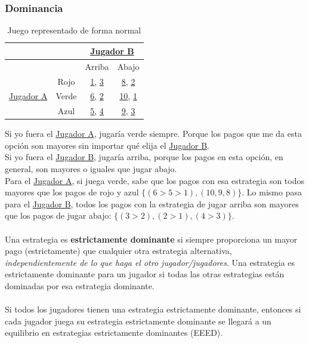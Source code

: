 \documentclass{article}
\newcommand{\ulcolor}[2][Red]{\setulcolor{#1}\ul{#2}}
\begin{document}
            \subsubsection*{Dominancia}
                \begin{table}[h]
                    \centering
                        \begin{tabular}{|c|c|c|c|}
                        \hline
                                                &               & \multicolumn{2}{c|}{\ulcolor[Blue]{Jugador B}} \\ \hline
                                                &               & Arriba & Abajo \\ \hline
                        \multirow{3}{*}{\ulcolor[Red]{Jugador A}} 
                                                & Rojo & \ulcolor[Red]{1}, \ulcolor[Blue]{3} & \ulcolor[Red]{8}, \ulcolor[Blue]{2} \\ \cline{2-4} 
                                                & Verde & \ulcolor[Red]{6}, \ulcolor[Blue]{2} & \ulcolor[Red]{10}, \ulcolor[Blue]{1}\\\cline{2-4}
                                                & Azul & \ulcolor[Red]{5}, \ulcolor[Blue]{4} & \ulcolor[Red]{9}, \ulcolor[Blue]{3}\\\hline
                        \end{tabular}
                    \caption{Juego representado de forma normal}
                \end{table}
                Si yo fuera el \ulcolor[Red]{Jugador A}, jugaría verde siempre. Porque los pagos que me da esta opción son mayores sin importar qué elija el \ulcolor[Blue]{Jugador B}. \\
                Si yo fuera el \ulcolor[Blue]{Jugador B}, jugaría arriba, porque los pagos en esta opción, en general, son mayores o iguales que jugar abajo. \\
                Para el \ulcolor[Red]{Jugador A}, si juega verde, sabe que los pagos con esa estrategia son todos mayores que los pagos de rojo y azul \(\{(6 > 5 > 1), (10, 9, 8)\}\). Lo mismo pasa para el \ulcolor[Blue]{Jugador B}, todos los pagos con la estrategia de jugar arriba son mayores que los pagos de jugar abajo: \(\{(3 > 2), (2 > 1), (4 > 3)\}\). \\
                \\
                Una estrategia es \textbf{estrictamente dominante} si siempre proporciona un mayor pago (estrictamente) que cualquier otra estrategia alternativa, \emph{independientemente de lo que haga el otro jugador/jugadores}. Una estrategia es estrictamente dominante para un jugador si todas las otras estrategias están dominadas por esa estrategia dominante. \\
                \\
                Si todos los jugadores tienen una estrategia estrictamente dominante, entonces si cada jugador juega su estrategia estrictamente dominante se llegará a un equilibrio en estrategias estrictamente dominantes (EEED).
\end{document}
